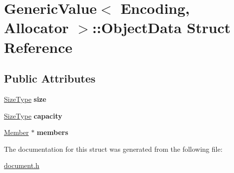 \hypertarget{a02108}{}\section{Generic\+Value$<$ Encoding, Allocator $>$\+:\+:Object\+Data Struct Reference}
\label{a02108}
\subsection*{Public Attributes}
\begin{DoxyCompactItemize}
\item 
\mbox{\label{a02108_a8aa09c430b245b9bb0745a1ab38201d5}} 
\hyperlink{a00560_a5ed6e6e67250fadbd041127e6386dcb5}{Size\+Type} {\bfseries size}
\item 
\mbox{\label{a02108_a22b8d8b01d52db71471f0d4c990cb93b}} 
\hyperlink{a00560_a5ed6e6e67250fadbd041127e6386dcb5}{Size\+Type} {\bfseries capacity}
\item 
\mbox{\label{a02108_a108be865f16e4c028f2354b1474a1ec8}} 
\hyperlink{a01992_a7ccf27c44058b4c11c3efc6473afb886}{Member} $\ast$ {\bfseries members}
\end{DoxyCompactItemize}


The documentation for this struct was generated from the following file\+:\begin{DoxyCompactItemize}
\item 
\hyperlink{a00476}{document.\+h}\end{DoxyCompactItemize}
